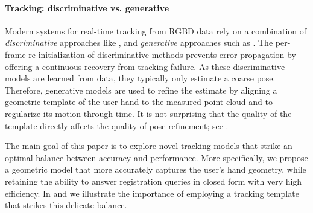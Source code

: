\paragraph{Tracking: discriminative vs. generative}
Modern systems for real-time tracking from RGBD data  \cite{sridhar2015fast,sharp2015accurate} rely on a combination of \emph{discriminative} approaches like \cite{keskin2012hand}, and \emph{generative} approaches such as \cite{oiko2011hand}. The per-frame re-initialization of discriminative methods prevents error propagation by offering a continuous recovery from tracking failure. As these discriminative models are learned from data, they typically only estimate a coarse pose. Therefore, generative models are used to refine the estimate by aligning a geometric template of the user hand to the measured point cloud and to regularize its motion through time. It is not surprising that the quality of the template directly affects the quality of pose refinement; see . 



The main goal of this paper is to explore novel tracking models that strike an optimal balance between accuracy and performance.
% 
% 
More specifically, we propose a geometric model that more accurately captures the user's hand geometry, while retaining the ability to answer registration queries in closed form with very high efficiency. In  and  we illustrate the importance of employing a tracking template that strikes this delicate balance.

